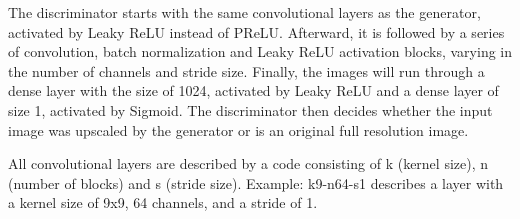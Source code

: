 \documentclass[11pt,twocolumn,twoside,paper=a4]{IEEEtran}
\begin{document}
The discriminator starts with the same convolutional layers as the generator, activated by Leaky ReLU instead of PReLU. 
Afterward, it is followed by a series of convolution, batch normalization and Leaky ReLU activation blocks, varying in the number of channels and stride size. 
Finally, the images will run through a dense layer with the size of 1024, activated by Leaky ReLU and a dense layer of size 1, activated by Sigmoid. 
The discriminator then decides whether the input image was upscaled by the generator or is an original full resolution image.

All convolutional layers are described by a code consisting of k (kernel size), n (number of blocks) and s (stride size). Example: k9-n64-s1 describes a layer with a kernel size of 9x9, 64 channels, and a stride of 1.

\begin{center}
    \begin{figure}[h] 

\end{figure}
\end{center}
\end{document}
